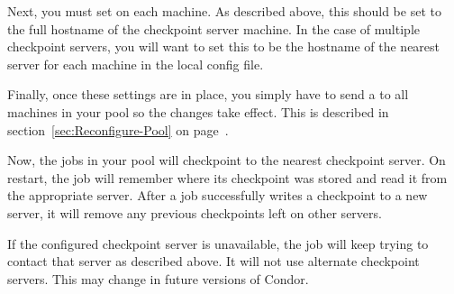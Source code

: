 Next, you must set  on each machine.
As described above, this should be set to the full hostname of the
checkpoint server machine.
In the case of multiple checkpoint servers, you will want to set this
to be the hostname of the nearest server for each machine in the local
config file.

Finally, once these settings are in place, you simply have to send a
 to all machines in your pool so the changes take
effect.
This is described in section~\ref{sec:Reconfigure-Pool} on
page~\pageref{sec:Reconfigure-Pool}.

Now, the jobs in your pool will checkpoint to the nearest checkpoint
server.
On restart, the job will remember where its checkpoint was
stored and read it from the appropriate server.
After a job successfully writes a checkpoint to a new server, it will
remove any previous checkpoints left on other servers.

\Note If the configured checkpoint server is unavailable, the job will
keep trying to contact that server as described above.
It will not use alternate checkpoint servers.
This may change in future versions of Condor.
